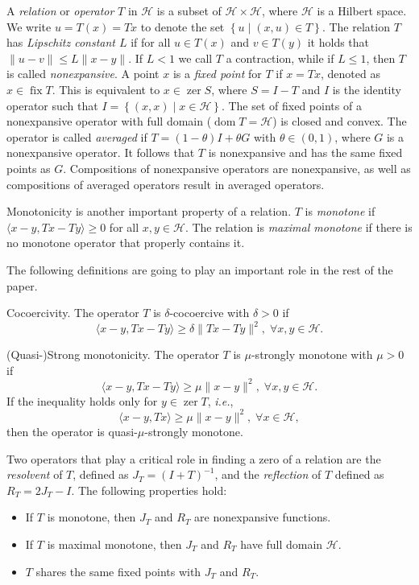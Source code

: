 \documentclass[envcountsect]{svjour3}
\newcommand{\ie}{{\it i.e.}}
\newcommand{\Hil}{{\mathcal{H} }}
\begin{document}
A \emph{relation} or \emph{operator} $T$ in $\Hil$ is a subset of $\Hil\times \Hil$, where $\Hil$ is a Hilbert space. We write $u=T(x)=Tx$ to denote the set $\left\{u\;|\;(x,u)\in T\right\}$. The relation $T$ has \emph{Lipschitz constant $L$} if for all $u\in T(x)$ and $v\in T(y)$ it holds that $\|u-v\|\le L\|x-y\|$. If $L<1$ we call $T$ a contraction, while if $L\le 1$, then $T$ is called \emph{nonexpansive}. A point $x$ is a \emph{fixed point} for $T$ if $x=Tx$, denoted as $x\in\operatorname{fix} T$. This is equivalent to $x\in\operatorname{zer} S$, where $S=I-T$ and $I$ is the identity operator such that $I=\left\{(x,x)\;|\;x\in\Hil\right\}$. The set of fixed points of a nonexpansive operator with full domain ($\operatorname{dom} T=\Hil$) is closed and convex. The operator is called \emph{averaged} if $T=(1-\theta)I+\theta G$ with $\theta\in(0,1)$, where $G$ is a nonexpansive operator. It follows that $T$ is nonexpansive and has the same fixed points as $G$. Compositions of nonexpansive operators are nonexpansive, as well as compositions of averaged operators result in averaged operators.

Monotonicity is another important property of a relation. $T$ is \emph{monotone} if $\langle x-y,Tx-Ty\rangle\ge 0$ for all $x,y\in\Hil$. The relation is \emph{maximal monotone} if there is no monotone operator that properly contains it.

The following definitions are going to play an important role in the rest of the paper.
\begin{definition}{Cocoercivity.}
The operator $T$ is $\delta$-cocoercive with $\delta>0$ if
\[
\langle x-y,Tx-Ty\rangle\geq \delta\|Tx-Ty\|^2,\;\forall x,y\in\Hil.
\]
\end{definition}
\begin{definition}{(Quasi-)Strong monotonicity.}
The operator $T$ is $\mu$-strongly monotone with $\mu>0$ if
\[
\langle x-y,Tx-Ty\rangle\geq \mu\|x-y\|^2,\;\forall x,y\in\Hil.
\]
If the inequality holds only for $y\in\operatorname{zer} T$, \ie,
\[
\langle x-y,Tx\rangle\geq \mu\|x-y\|^2,\;\forall x\in\Hil,
\]
then the operator is quasi-$\mu$-strongly monotone.
\end{definition}

Two operators that play a critical role in finding a zero of a relation are the \emph{resolvent} of $T$, defined as $J_T=(I+T)^{-1}$, and the \emph{reflection} of $T$ defined as $R_T=2J_T-I$. The following properties hold:
\begin{itemize}
 \item If $T$ is monotone, then $J_T$ and $R_T$ are nonexpansive functions.
 \item If $T$ is maximal monotone, then $J_T$ and $R_T$ have full domain $\Hil$.
 \item $T$ shares the same fixed points with $J_T$ and $R_T$.
\end{itemize}
\end{document}
